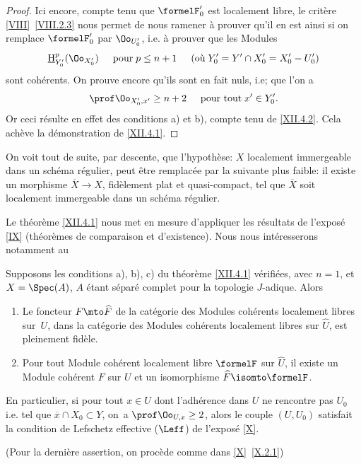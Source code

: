 \begin{proof}
\enlargethispage{\baselineskip}%
Ici encore, compte tenu que $\formelF_0'$ est localement libre, le crit\`ere \ref{VIII}~\ref{VIII.2.3} nous permet de nous ramener \`a prouver qu'il en est ainsi si on remplace $\formelF_0'$ par $\Oo_{U'_0}$, i.e. \`a prouver que les Modules
\[
\mathop{\underline{\mathrm{H}}}\nolimits^p_{Y_0'}(\Oo_{X_0'}) \hspace{5mm} \text{pour} \; p\leq n+1 \hspace{5mm} \text{(où} \; Y'_0=Y'\cap X_0'=X_0'- U'_0 \text{)}
\]
sont coh\'erents. On prouve encore qu'ils sont en fait nuls, i.e; que l'on a
\steco
\begin{equation} \label{eq:XII.25} {}\prof \Oo_{X'_0, x'} \geq n+2 \hspace{5mm} \text{pour tout} \; x'\in Y'_0.
\end{equation}
Or ceci r\'esulte en effet des conditions a) et b), compte tenu de \ref{XII.4.2}. Cela ach\`eve la d\'emonstration de \ref{XII.4.1}.
\skipqed
\end{proof}

\begin{remarque} \label{XII.4.3}
On voit tout de suite, par descente, que l'hypoth\`ese: $X$ localement immergeable dans un sch\'ema r\'egulier, peut \^etre remplac\'ee par la suivante plus faible: il existe un morphisme $\overline{X}\to X$, fid\`element plat et quasi-compact, tel que $\overline{X}$ soit localement immergeable dans un sch\'ema r\'egulier.
\end{remarque}

Le th\'eor\`eme \ref{XII.4.1} nous met en mesure d'appliquer les r\'esultats de l'expos\'e \ref{IX} (th\'eor\`emes de comparaison et d'existence). Nous nous int\'eresserons notamment au

\begin{corollaire} \label{XII.4.4}
Supposons les conditions a), b), c) du th\'eor\`eme \ref{XII.4.1} v\'erifi\'ees, avec $n=1$, et $X=\Spec(A)$, $A$ \'etant s\'epar\'e complet pour la topologie $J$-adique. Alors
\begin{enumerate}
\item[\textup{1\noo})] Le foncteur $F\mto \widehat{F}$ de la cat\'egorie des Modules coh\'erents localement libres sur~$U$, dans la cat\'egorie des Modules coh\'erents localement libres sur $\widehat{U}$, est pleinement fid\`ele. \item[\textup{2\noo})] Pour tout Module coh\'erent localement libre $\formelF$ sur $\widehat{U}$, il existe un Module coh\'erent $F$ sur $U$ et un isomorphisme $\widehat{F}\isomto \formelF$.
\end{enumerate}
En particulier, si pour tout $x\in U$ dont l'adh\'erence dans $U$ ne rencontre pas $U_0$ i.e. tel que $\overline{x}\cap X_0\subset Y$, on~a $\prof \Oo_{U, x}\geq 2$, alors le couple $(U, U_0)$ satisfait la condition de Lefschetz effective ($\Leff$) de l'expos\'e \ref{X}.
\end{corollaire}
\noindent
(Pour la derni\`ere assertion, on proc\`ede comme dans \ref{X}~\ref{X.2.1})

